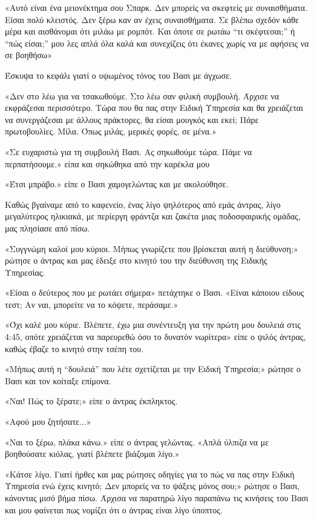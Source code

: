 \documentclass[12pt,twoside, openany]{book}
\begin{document}
«Αυτό είναι ένα μειονέκτημα σου Σπαρκ. Δεν μπορείς να σκεφτείς με συναισθήματα. Είσαι πολύ κλειστός. Δεν ξέρω καν αν έχεις συναισθήματα. Σε βλέπω σχεδόν κάθε μέρα και αισθάνομαι ότι μιλάω με ρομπότ. Και όποτε σε ρωτάω “τι σκέφτεσαι;” ή “πώς είσαι;” μου λες απλά όλα καλά και συνεχίζεις ότι έκανες χωρίς να με αφήσεις να σε βοηθήσω»

Έσκυψα το κεφάλι γιατί ο υψωμένος τόνος του Βασι με άγχωσε.

«Δεν στο λέω για να τσακωθούμε. Στο λέω σαν φιλική συμβουλή. Άρχισε να εκφράζεσαι περισσότερο. Τώρα που θα πας στην Ειδική Υπηρεσία και θα χρειάζεται να συνεργάζεσαι με άλλους πράκτορες, θα είσαι μουγκός και εκεί; Πάρε πρωτοβουλίες. Μίλα. Όπως μιλάς, μερικές φορές, σε μένα.»

«Σε ευχαριστώ για τη συμβουλή Βασι. Ας σηκωθούμε τώρα. Πάμε να περπατήσουμε.» είπα και σηκώθηκα από την καρέκλα μου

«Έτσι μπράβο.» είπε ο Βασι χαμογελώντας και με ακολούθησε.

Καθώς βγαίναμε από το καφενείο, ένας λίγο ψηλότερος από εμάς άντρας,  λίγο μεγαλύτερος ηλικιακά, με περίεργη φράντζα και ζακέτα μιας ποδοσφαιρικής ομάδας, μας πλησίασε από πίσω.

«Συγγνώμη καλοί μου κύριοι. Μήπως γνωρίζετε που βρίσκεται αυτή η διεύθυνση;» ρώτησε ο άντρας και μας έδειξε στο κινητό του την διεύθυνση της Ειδικής Υπηρεσίας.

«Είσαι ο δεύτερος που με ρωτάει σήμερα» πετάχτηκε ο Βασι. «Είναι κάποιου είδους τεστ; Αν ναι, μπορείτε να το κόψετε, περάσαμε.»

«Όχι καλέ μου κύριε. Βλέπετε, έχω μια συνέντευξη για την πρώτη μου δουλειά στις 4:45, οπότε χρειάζεται να παρευρεθώ όσο το δυνατόν νωρίτερα» είπε ο ψιλός άντρας, καθώς έβαζε το κινητό στην τσέπη του.

«Μήπως αυτή η “δουλειά” που λέτε σχετίζεται με την Ειδική Υπηρεσία;» ρώτησε ο Βασι και τον κοίταξε επίμονα.

«Ναι! Πώς το ξέρατε;» είπε ο άντρας έκπληκτος.

«Αφού μου ζητήσατε...»

«Ναι το ξέρω, πλάκα κάνω.» είπε ο άντρας γελώντας. «Απλά ύλπιζα να με βοηθούσατε κιόλας, γιατί βλέπετε βιάζομαι λίγο.»

«Κάτσε λίγο. Γιατί ήρθες και μας ρώτησες οδηγίες για το πώς να πας στην Ειδική Υπηρεσία ενώ έχεις κινητό; Δεν μπορείς να το ψάξεις μόνος σου;» ρώτησε ο Βασι, κάνοντας μισό βήμα πίσω. Άρχισα να παρατηρώ λίγο παραπάνω τις κινήσεις του Βασι και μου φαίνεται πως νομίζει ότι ο άντρας είναι λίγο ύποπτος.
\end{document}
